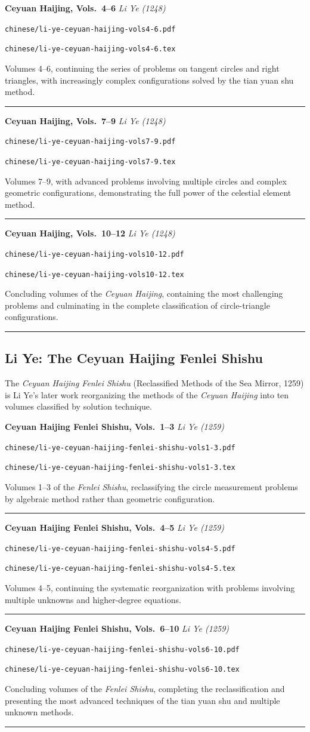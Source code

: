 \documentclass[11pt,a4paper]{article}
\newcommand{\workitem}[5]{%
  \par\smallskip
  \noindent\textbf{\large #1} \hfill \textit{#2}\par
  \noindent\texttt{\small #3}\par
  \noindent\texttt{\small #4}\par
  \noindent #5\par
  \smallskip\noindent\rule{\textwidth}{0.2pt}
}
\begin{document}
\workitem
  {Ceyuan Haijing, Vols.~4--6}
  {Li Ye (1248)}
  {chinese/li-ye-ceyuan-haijing-vols4-6.pdf}
  {chinese/li-ye-ceyuan-haijing-vols4-6.tex}
  {Volumes 4--6, continuing the series of problems on tangent circles and right triangles, with increasingly complex configurations solved by the tian yuan shu method.}

\workitem
  {Ceyuan Haijing, Vols.~7--9}
  {Li Ye (1248)}
  {chinese/li-ye-ceyuan-haijing-vols7-9.pdf}
  {chinese/li-ye-ceyuan-haijing-vols7-9.tex}
  {Volumes 7--9, with advanced problems involving multiple circles and complex geometric configurations, demonstrating the full power of the celestial element method.}

\workitem
  {Ceyuan Haijing, Vols.~10--12}
  {Li Ye (1248)}
  {chinese/li-ye-ceyuan-haijing-vols10-12.pdf}
  {chinese/li-ye-ceyuan-haijing-vols10-12.tex}
  {Concluding volumes of the \textit{Ceyuan Haijing}, containing the most challenging problems and culminating in the complete classification of circle-triangle configurations.}

\subsection*{Li Ye: The Ceyuan Haijing Fenlei Shishu}

The \textit{Ceyuan Haijing Fenlei Shishu} (Reclassified Methods of the Sea Mirror, 1259) is Li Ye's later work reorganizing the methods of the \textit{Ceyuan Haijing} into ten volumes classified by solution technique.

\workitem
  {Ceyuan Haijing Fenlei Shishu, Vols.~1--3}
  {Li Ye (1259)}
  {chinese/li-ye-ceyuan-haijing-fenlei-shishu-vols1-3.pdf}
  {chinese/li-ye-ceyuan-haijing-fenlei-shishu-vols1-3.tex}
  {Volumes 1--3 of the \textit{Fenlei Shishu}, reclassifying the circle measurement problems by algebraic method rather than geometric configuration.}

\workitem
  {Ceyuan Haijing Fenlei Shishu, Vols.~4--5}
  {Li Ye (1259)}
  {chinese/li-ye-ceyuan-haijing-fenlei-shishu-vols4-5.pdf}
  {chinese/li-ye-ceyuan-haijing-fenlei-shishu-vols4-5.tex}
  {Volumes 4--5, continuing the systematic reorganization with problems involving multiple unknowns and higher-degree equations.}

\workitem
  {Ceyuan Haijing Fenlei Shishu, Vols.~6--10}
  {Li Ye (1259)}
  {chinese/li-ye-ceyuan-haijing-fenlei-shishu-vols6-10.pdf}
  {chinese/li-ye-ceyuan-haijing-fenlei-shishu-vols6-10.tex}
  {Concluding volumes of the \textit{Fenlei Shishu}, completing the reclassification and presenting the most advanced techniques of the tian yuan shu and multiple unknown methods.}
\end{document}
